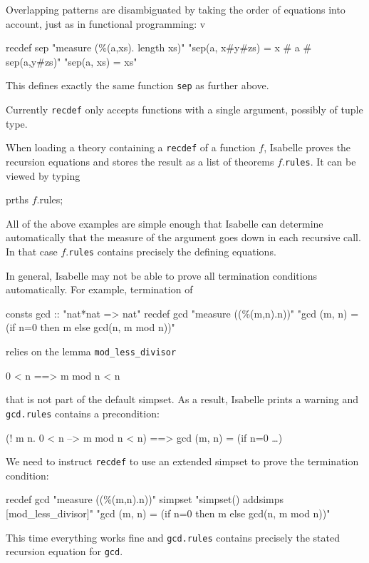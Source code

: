 Overlapping patterns are disambiguated by taking the order of equations into
account, just as in functional programming:
v\begin{ttbox}
recdef sep "measure (\%(a,xs). length xs)"
    "sep(a, x#y#zs) = x # a # sep(a,y#zs)"
    "sep(a, xs)     = xs"
\end{ttbox}
This defines exactly the same function \texttt{sep} as further above.

\begin{warn}
Currently \texttt{recdef} only accepts functions with a single argument,
possibly of tuple type.
\end{warn}

When loading a theory containing a \texttt{recdef} of a function $f$,
Isabelle proves the recursion equations and stores the result as a list of
theorems $f$.\texttt{rules}. It can be viewed by typing
\begin{ttbox}
prths \(f\).rules;
\end{ttbox}
All of the above examples are simple enough that Isabelle can determine
automatically that the measure of the argument goes down in each recursive
call. In that case $f$.\texttt{rules} contains precisely the defining
equations.

In general, Isabelle may not be able to prove all termination conditions
automatically. For example, termination of
\begin{ttbox}
consts gcd :: "nat*nat => nat"
recdef gcd "measure ((\%(m,n).n))"
    "gcd (m, n) = (if n=0 then m else gcd(n, m mod n))"
\end{ttbox}
relies on the lemma \texttt{mod_less_divisor}
\begin{ttbox}
0 < n ==> m mod n < n
\end{ttbox}
that is not part of the default simpset. As a result, Isabelle prints a
warning and \texttt{gcd.rules} contains a precondition:
\begin{ttbox}
(! m n. 0 < n --> m mod n < n) ==> gcd (m, n) = (if n=0 \dots)
\end{ttbox}
We need to instruct \texttt{recdef} to use an extended simpset to prove the
termination condition:
\begin{ttbox}
recdef gcd "measure ((\%(m,n).n))"
  simpset "simpset() addsimps [mod_less_divisor]"
    "gcd (m, n) = (if n=0 then m else gcd(n, m mod n))"
\end{ttbox}
This time everything works fine and \texttt{gcd.rules} contains precisely the
stated recursion equation for \texttt{gcd}.

